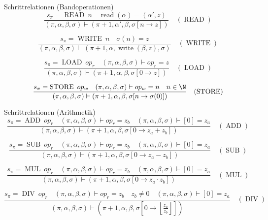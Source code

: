 \documentclass[german]{spicker}
\begin{document}
\begin{example}{Schrittrelationen (Bandoperationen)}
  $$
    \frac{s_\pi = \operatorname{READ} \ n \quad \operatorname{read}(\alpha) = (\alpha', z)}{(\pi, \alpha, \beta, \sigma) \vdash (\pi + 1, \alpha', \beta, \sigma[n\to z])} \quad (\operatorname{READ})
  $$

  $$
    \frac{s_\pi = \operatorname{WRITE} \ n \quad \sigma(n) = z}{(\pi, \alpha, \beta, \sigma) \vdash (\pi + 1, \alpha, \operatorname{write}(\beta, z), \sigma)} \quad (\operatorname{WRITE})
  $$

  $$
    \frac{s_\pi = \operatorname{LOAD} \ op_r \quad (\pi, \alpha, \beta, \sigma) \vdash op_r = z}{(\pi, \alpha, \beta, \sigma) \vdash (\pi + 1, \alpha, \beta, \sigma[0\to z])} \quad (\operatorname{LOAD})
  $$

  $$
    \frac{s_\pi = \operatorname{STORE} \ op_w \quad (\pi, \alpha, \beta, \sigma) \vdash op_w = n \quad n\in \N}{(\pi, \alpha, \beta, \sigma) \vdash (\pi + 1, \alpha, \beta, \sigma[n\to \sigma(0)])} \quad (\operatorname{STORE})
  $$
\end{example}

\begin{example}{Schrittrelationen (Arithmetik)}
  $$
    \frac{s_\pi = \operatorname{ADD} \ op_r \quad (\pi, \alpha, \beta, \sigma) \vdash op_r = z_b \quad (\pi, \alpha, \beta, \sigma) \vdash [0] = z_a}{(\pi, \alpha, \beta, \sigma) \vdash (\pi + 1, \alpha, \beta, \sigma[0\to z_a + z_b])} \quad (\operatorname{ADD})
  $$

  $$
    \frac{s_\pi = \operatorname{SUB} \ op_r \quad (\pi, \alpha, \beta, \sigma) \vdash op_r = z_b \quad (\pi, \alpha, \beta, \sigma) \vdash [0] = z_a}{(\pi, \alpha, \beta, \sigma) \vdash (\pi + 1, \alpha, \beta, \sigma[0\to z_a - z_b])} \quad (\operatorname{SUB})
  $$

  $$
    \frac{s_\pi = \operatorname{MUL} \ op_r \quad (\pi, \alpha, \beta, \sigma) \vdash op_r = z_b \quad (\pi, \alpha, \beta, \sigma) \vdash [0] = z_a}{(\pi, \alpha, \beta, \sigma) \vdash (\pi + 1, \alpha, \beta, \sigma[0\to z_a \cdot z_b])} \quad (\operatorname{MUL})
  $$

  $$
    \frac{s_\pi = \operatorname{DIV} \ op_r \quad (\pi, \alpha, \beta, \sigma) \vdash op_r = z_b \quad z_b \neq 0 \quad (\pi, \alpha, \beta, \sigma) \vdash [0] = z_a}{(\pi, \alpha, \beta, \sigma) \vdash \left(\pi + 1, \alpha, \beta, \sigma[0\to \left\lfloor \frac{z_a}{z_b} \right\rfloor ]\right)} \quad (\operatorname{DIV})
  $$
\end{example}
\end{document}
